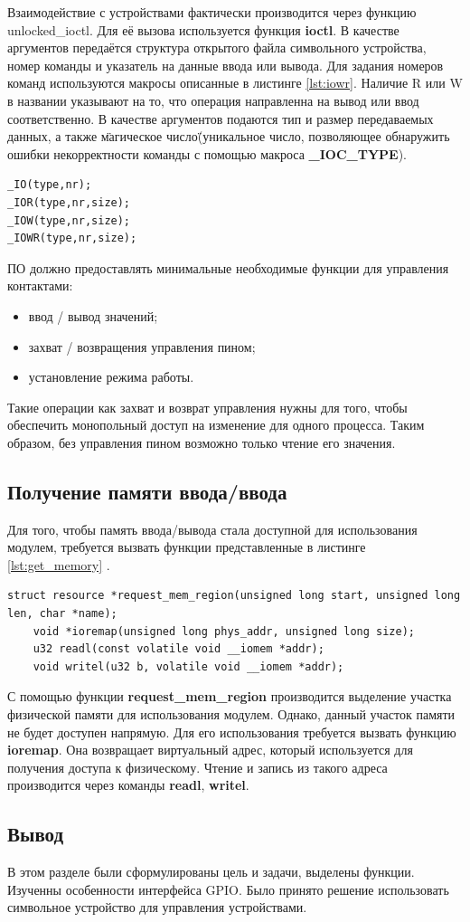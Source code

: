 Взаимодействие с устройствами фактически производится через функцию unlocked\_ioctl. Для её вызова используется функция \textbf{ioctl}. В качестве аргументов передаётся структура открытого файла символьного устройства, номер команды и указатель на данные ввода или вывода. Для задания номеров команд используются макросы описанные в листинге \ref{lst:iowr}. Наличие R или W в названии указывают на то, что операция направленна на вывод или ввод соответственно. В качестве аргументов подаются тип и размер передаваемых данных, а также \"магическое число\" (уникальное число, позволяющее обнаружить ошибки некорректности команды с помощью макроса \textbf{\_IOC\_TYPE}).

\begin{lstlisting}[caption = {Макросы команд ioctl}, label=lst:iowr]
_IO(type,nr);
_IOR(type,nr,size);
_IOW(type,nr,size);
_IOWR(type,nr,size);
\end{lstlisting}

ПО должно предоставлять минимальные необходимые функции для управления контактами:
\begin{itemize}
	\item ввод / вывод значений;
	\item захват / возвращения управления пином;
	\item установление режима работы.
\end{itemize} 

Такие операции как захват и возврат управления нужны для того, чтобы обеспечить монопольный доступ на изменение для одного процесса. Таким образом, без управления пином возможно только чтение его значения.

\subsection{Получение памяти ввода/ввода}
Для того, чтобы память ввода/вывода стала доступной для использования модулем, требуется вызвать функции представленные в листинге \ref{lst:get_memory} \cite{subj:memory}.

\begin{lstlisting}[caption = {Получение доступа к памяти IO}, label=lst:get_memory]
	struct resource *request_mem_region(unsigned long start, unsigned long len, char *name);
	void *ioremap(unsigned long phys_addr, unsigned long size);
	u32 readl(const volatile void __iomem *addr);
	void writel(u32 b, volatile void __iomem *addr);
\end{lstlisting}

С помощью функции \textbf{request\_mem\_region} производится выделение участка физической памяти для использования модулем. Однако, данный участок памяти не будет доступен напрямую. Для его использования требуется вызвать функцию \textbf{ioremap}. Она возвращает виртуальный адрес, который используется для получения доступа к физическому. Чтение и запись из такого адреса производится через команды \textbf{readl}, \textbf{writel}.

\subsection*{Вывод}
В этом разделе были сформулированы цель и задачи, выделены функции. Изученны особенности интерфейса GPIO. Было принято решение использовать символьное устройство для управления устройствами.
